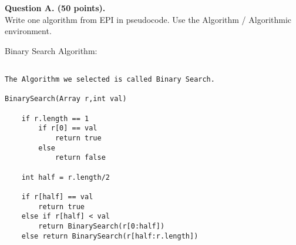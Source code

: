 \documentclass[12pt]{article}
\begin{document}
\noindent
\textbf{Question A. (50 points).}\\
Write one algorithm from EPI in pseudocode. Use the Algorithm / Algorithmic environment.

Binary Search Algorithm:

\begin{verbatim}

The Algorithm we selected is called Binary Search.

BinarySearch(Array r,int val)

	if r.length == 1
		if r[0] == val
			return true
		else
			return false
		
	int half = r.length/2
	
	if r[half] == val
		return true
	else if r[half] < val
		return BinarySearch(r[0:half])
	else return BinarySearch(r[half:r.length])
	
			

\end{verbatim}
\end{document}
